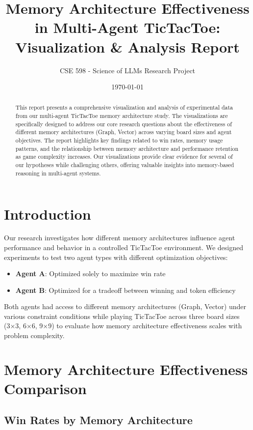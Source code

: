 \documentclass[10pt]{article}
\title{\Large Memory Architecture Effectiveness in Multi-Agent TicTacToe: Visualization \& Analysis Report}
\author{\small CSE 598 - Science of LLMs Research Project}
\date{\small \today}
\begin{document}
\maketitle

\begin{abstract}
\small
This report presents a comprehensive visualization and analysis of experimental data from our multi-agent TicTacToe memory architecture study. The visualizations are specifically designed to address our core research questions about the effectiveness of different memory architectures (Graph, Vector) across varying board sizes and agent objectives. The report highlights key findings related to win rates, memory usage patterns, and the relationship between memory architecture and performance retention as game complexity increases. Our visualizations provide clear evidence for several of our hypotheses while challenging others, offering valuable insights into memory-based reasoning in multi-agent systems.
\end{abstract}

\section{Introduction}
\small
Our research investigates how different memory architectures influence agent performance and behavior in a controlled TicTacToe environment. We designed experiments to test two agent types with different optimization objectives:
\begin{itemize}[leftmargin=*,noitemsep]
    \item \textbf{Agent A}: Optimized solely to maximize win rate
    \item \textbf{Agent B}: Optimized for a tradeoff between winning and token efficiency
\end{itemize}

Both agents had access to different memory architectures (Graph, Vector) under various constraint conditions while playing TicTacToe across three board sizes (3×3, 6×6, 9×9) to evaluate how memory architecture effectiveness scales with problem complexity.

\section{Memory Architecture Effectiveness Comparison}

\subsection{Win Rates by Memory Architecture}
\end{document}
